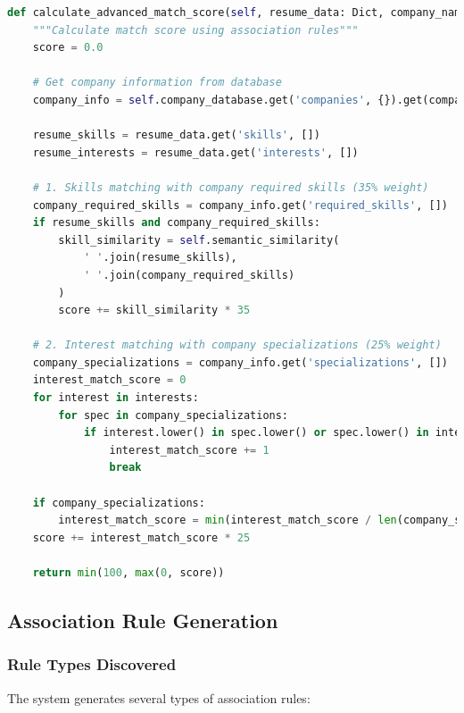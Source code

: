 \documentclass[12pt,a4paper]{article}
\begin{document}
\begin{lstlisting}[language=Python, caption=Frequent Itemset Mining]
def calculate_advanced_match_score(self, resume_data: Dict, company_name: str, interests: List[str]) -> float:
    """Calculate match score using association rules"""
    score = 0.0
    
    # Get company information from database
    company_info = self.company_database.get('companies', {}).get(company_name, {})
    
    resume_skills = resume_data.get('skills', [])
    resume_interests = resume_data.get('interests', [])
    
    # 1. Skills matching with company required skills (35% weight)
    company_required_skills = company_info.get('required_skills', [])
    if resume_skills and company_required_skills:
        skill_similarity = self.semantic_similarity(
            ' '.join(resume_skills), 
            ' '.join(company_required_skills)
        )
        score += skill_similarity * 35
    
    # 2. Interest matching with company specializations (25% weight)
    company_specializations = company_info.get('specializations', [])
    interest_match_score = 0
    for interest in interests:
        for spec in company_specializations:
            if interest.lower() in spec.lower() or spec.lower() in interest.lower():
                interest_match_score += 1
                break
    
    if company_specializations:
        interest_match_score = min(interest_match_score / len(company_specializations), 1.0)
    score += interest_match_score * 25
    
    return min(100, max(0, score))
\end{lstlisting}

\subsection{Association Rule Generation}

\subsubsection{Rule Types Discovered}
The system generates several types of association rules:
\end{document}
